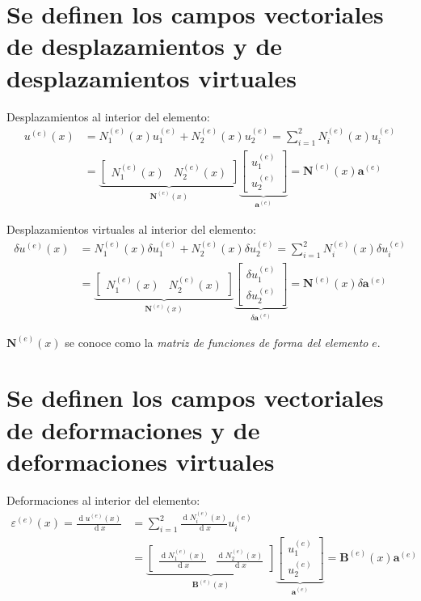 \documentclass[12pt,landscape,letterpaper]{article}
\newcommand{\ve}[1]{{\boldsymbol{#1}}}
\newcommand{\ma}[1]{{\boldsymbol{#1}}}
\newcommand{\dd}{\operatorname{d} \!}
\begin{document}
\section{Se definen los campos vectoriales de desplazamientos y  de desplazamientos virtuales}

Desplazamientos al interior del elemento:
\begin{align}
u^{(e)}(x) 
&= N_1^{(e)}(x) u_1^{(e)} + N_2^{(e)}(x) u_2^{(e)} 
= \sum_{i=1}^2 N_i^{(e)}(x) u_i^{(e)} \\
&= 
\underbrace{\begin{bmatrix}
N_1^{(e)}(x) & N_2^{(e)}(x)
\end{bmatrix}}_{\ma{N}^{(e)}(x)}
\underbrace{\begin{bmatrix}
   u_1^{(e)} \\ u_2^{(e)}
   \end{bmatrix}}_{\ma{a}^{(e)}} = \ma{N}^{(e)}(x)  \ve{a}^{(e)}
\end{align}

Desplazamientos virtuales al interior del elemento:
\begin{align}
\delta u^{(e)}(x) 
&= N_1^{(e)}(x) \delta u_1^{(e)} + N_2^{(e)}(x) \delta u_2^{(e)} = \sum_{i=1}^2 N_i^{(e)}(x) \delta u_i^{(e)} \\
&= 
\underbrace{\begin{bmatrix}
   N_1^{(e)}(x) & N_2^{(e)}(x)
   \end{bmatrix}}_{\ma{N}^{(e)}(x)}
\underbrace{\begin{bmatrix}
   \delta u_1^{(e)} \\ \delta u_2^{(e)}
   \end{bmatrix}}_{\delta \ma{a}^{(e)}} = \ma{N}^{(e)}(x) \delta \ve{a}^{(e)}
\end{align}

$\ma{N}^{(e)}(x)$ se conoce como la \emph{matriz de funciones de forma del elemento} $e$.

\newpage

\section{Se definen los campos vectoriales de deformaciones y  de deformaciones virtuales}

Deformaciones al interior del elemento:
\begin{align}
\varepsilon^{(e)}(x) = \frac{\dd u^{(e)}(x)}{\dd x} 
&= \sum_{i=1}^2 \frac{\dd N_i^{(e)}(x)}{\dd x} u_i^{(e)} \\
&= 
\underbrace{\begin{bmatrix}
  \frac{\dd N_1^{(e)}(x)}{\dd x} & \frac{\dd N_2^{(e)}(x)}{\dd x}
   \end{bmatrix}}_{\ma{B}^{(e)}(x)}
\underbrace{\begin{bmatrix}
   u_1^{(e)} \\ u_2^{(e)}
   \end{bmatrix}}_{\ma{a}^{(e)}} = \ma{B}^{(e)}(x)  \ve{a}^{(e)}
\end{align}
\end{document}
